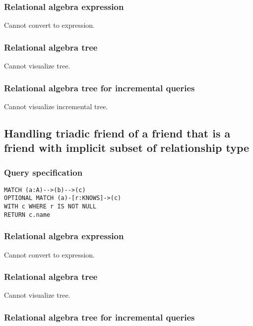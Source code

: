\subsubsection*{Relational algebra expression}

Cannot convert to expression.

\subsubsection*{Relational algebra tree}

Cannot visualize tree.

\subsubsection*{Relational algebra tree for incremental queries}

Cannot visualize incremental tree.

\subsection{Handling triadic friend of a friend that is a friend with implicit subset of relationship type}

\subsubsection*{Query specification}

\begin{lstlisting}
MATCH (a:A)-->(b)-->(c)
OPTIONAL MATCH (a)-[r:KNOWS]->(c)
WITH c WHERE r IS NOT NULL
RETURN c.name
\end{lstlisting}

\subsubsection*{Relational algebra expression}

Cannot convert to expression.

\subsubsection*{Relational algebra tree}

Cannot visualize tree.

\subsubsection*{Relational algebra tree for incremental queries}


